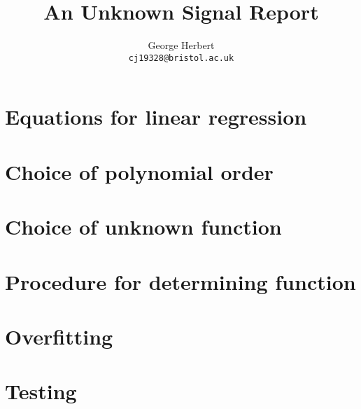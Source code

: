 \documentclass[onecolumn, 12pt, a4paper]{article}
\author{
  George Herbert\\
  \texttt{cj19328@bristol.ac.uk}
}
\title{An Unknown Signal Report}
\begin{document}
\maketitle

\section{Equations for linear regression}

\section{Choice of polynomial order}

\section{Choice of unknown function}

\section{Procedure for determining function}

\section{Overfitting}

\section{Testing}
\end{document}
